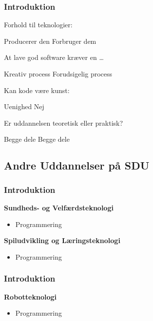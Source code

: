 {\begin{frame}[fragile]
  \frametitle{Introduktion }
  \vspace{-1mm}
  Forhold til teknologier:
  \begin{itemize}
     Producerer den
     Forbruger dem
  \end{itemize}
  
  \pause
  \vspace{2mm}
  At lave god software kræver en \ldots
  \begin{itemize}
     Kreativ process
     Forudsigelig process
  \end{itemize}
  
  \pause
  \vspace{2mm}
  Kan kode være kunst:
  \begin{itemize}
     Uenighed
     Nej
  \end{itemize}
  
  \pause
  \vspace{2mm}
  Er uddannelsen teoretisk eller praktisk?
  \begin{itemize}
     Begge dele
     Begge dele
  \end{itemize}
\end{frame}

\subsection{Andre Uddannelser på SDU}
\begin{frame}[fragile]
  \frametitle{Introduktion }
  \vspace{7mm}
  \textbf{Sundheds- og Velfærdsteknologi}
  \begin{itemize}
     BSc og MSc
     Anatomi, Bevægelse, Fysiologi, Medicinsk udstyr
    \item Programmering
  \end{itemize}
  
  \pause
  \vspace{9mm}
  \textbf{Spiludvikling og Læringsteknologi}
  \begin{itemize}
     BSc \textcolor{purple}{(og MSc via Software Engineering)}
     Læringsteori, Spilprogrammering, Virtual \& Augmented Reality, Robotik, Historiefortælling
    \item Programmering
  \end{itemize}
\end{frame}
\begin{frame}[fragile]
  \frametitle{Introduktion }
  \vspace{7mm}
  \textbf{Robotteknologi}
  \begin{itemize}
     BSc (både diplom og civil) og MSc
     Mekanik, Elektronik, Kinematik, Radio
    \item Programmering
  \end{itemize}
  

\end{frame}}
